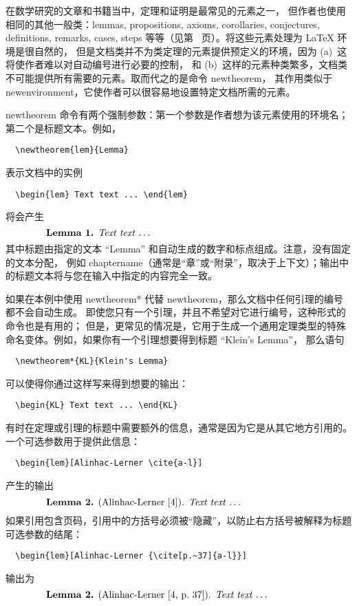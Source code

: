\documentclass{article}
\providecommand{\qq}[1]{“#1”}
\newcommand{\ntt}{%
  \fontfamily\ttdefault \fontseries\mddefault \fontshape\updefault
  \selectfont
}
\DeclareRobustCommand{\cn}[1]{{\ntt\bslchar#1}}
\def\latex/{{\protect\LaTeX}}
\begin{document}
在数学研究的文章和书籍当中，定理和证明是最常见的元素之一，
但作者也使用相同的其他一般类：lemmas, propositions, axioms, corollaries, conjectures, definitions, remarks, cases, steps 
等等（见第~\pageref{thmstyle:list} 页）。将这些元素处理为 \latex/ 环境是很自然的，
但是文档类并不为类定理的元素提供预定义的环境，因为 (a)~这将使作者难以对自动编号进行必要的控制，
和 (b)~这样的元素种类繁多，文档类不可能提供所有需要的元素。取而代之的是命令 \cn{newtheorem}，
其作用类似于 \cn{newenvironment}，它使作者可以很容易地设置特定文档所需的元素。

\cn{newtheorem} 命令有两个强制参数：第一个参数是作者想为该元素使用的环境名；第二个是标题文本。例如，
\begin{verbatim}
  \newtheorem{lem}{Lemma}
\end{verbatim}
表示文档中的实例
\begin{verbatim}
  \begin{lem} Text text ... \end{lem}
\end{verbatim}
将会产生
\[\makebox[.8\columnwidth]{%
  \textbf{Lemma 1.} \textit{Text text \dots}\hfill}\]
其中标题由指定的文本 \qq{Lemma} 和自动生成的数字和标点组成。注意，没有固定的文本分配，
例如 \cn{chaptername}（通常是“章”或“附录”，取决于上下文）；输出中的标题文本将与您在输入中指定的内容完全一致。

如果在本例中使用 \cn{newtheorem*} 代替 \cn{newtheorem}，那么文档中任何引理的编号都不会自动生成。
即使您只有一个引理，并且不希望对它进行编号，这种形式的命令也是有用的；
但是，更常见的情况是，它用于生成一个通用定理类型的特殊命名变体。例如，如果你有一个引理想要得到标题 \qq{Klein's Lemma}，
那么语句
\begin{verbatim}
  \newtheorem*{KL}{Klein's Lemma}
\end{verbatim}
可以使得你通过这样写来得到想要的输出：
\begin{verbatim}
  \begin{KL} Text text ... \end{KL}
\end{verbatim}


有时在定理或引理的标题中需要额外的信息，通常是因为它是从其它地方引用的。一个可选参数用于提供此信息：
\begin{verbatim}
  \begin{lem}[Alinhac-Lerner \cite{a-l}]
\end{verbatim}
产生的输出
\[\makebox[.8\columnwidth]{%
  \textbf{Lemma 2.} (Alinhac-Lerner [4]). \textit{Text text \dots}\hfill}\]
如果引用包含页码，引用中的方括号必须被“隐藏”，以防止右方括号被解释为标题可选参数的结尾：
\begin{verbatim}
  \begin{lem}[Alinhac-Lerner {\cite[p.~37]{a-l}}]
\end{verbatim}
输出为
\[\makebox[.8\columnwidth]{%
  \textbf{Lemma 2.} (Alinhac-Lerner [4, p.~37]). \textit{Text text \dots}\hfill}\]
\end{document}
